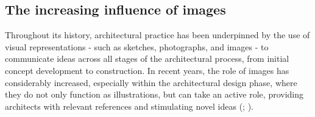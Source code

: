 




\subsection{The increasing influence of images}
Throughout its history, architectural practice has been underpinned by the use of visual representations - such as sketches, photographs, and images - to communicate ideas across all stages of the architectural process, from initial concept development to construction. In recent years, the role of images has considerably increased, especially within the architectural design phase, where they do not only function as illustrations, but can take an active role, providing architects with relevant references and stimulating novel ideas (\cite{bergera_architecture_2022}; \cite{halin_three_2003}).

